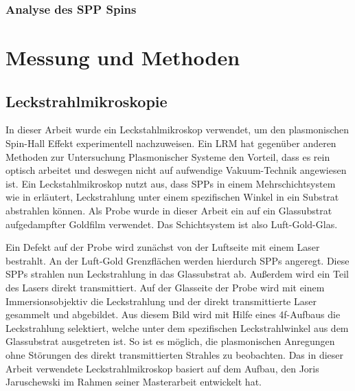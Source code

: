 \documentclass{article}
\begin{document}
	\subsubsection{Analyse des SPP Spins}	
\section{Messung und Methoden}
\subsection{Leckstrahlmikroskopie}
	In dieser Arbeit wurde ein Leckstahlmikroskop verwendet, um den plasmonischen Spin-Hall Effekt experimentell nachzuweisen. Ein LRM hat gegenüber anderen Methoden zur Untersuchung Plasmonischer Systeme den Vorteil, dass es rein optisch arbeitet und deswegen nicht auf aufwendige Vakuum-Technik angewiesen ist. Ein Leckstahlmikroskop nutzt aus, dass SPPs in einem Mehrschichtsystem wie in  erläutert, Leckstrahlung unter einem spezifischen Winkel in ein Substrat abstrahlen können. Als Probe wurde in dieser Arbeit ein auf ein Glassubstrat aufgedampfter Goldfilm verwendet. Das Schichtsystem ist also Luft-Gold-Glas.
	
	Ein Defekt auf der Probe wird zunächst von der Luftseite mit einem Laser bestrahlt. An der Luft-Gold Grenzflächen werden hierdurch SPPs angeregt. Diese SPPs strahlen nun Leckstrahlung in das Glassubstrat ab.
	Außerdem wird ein Teil des Lasers direkt transmittiert. Auf der Glasseite der Probe wird mit einem Immersionsobjektiv die Leckstrahlung und der direkt transmittierte Laser gesammelt und abgebildet.	
	 Aus diesem Bild wird mit Hilfe eines 4f-Aufbaus die Leckstrahlung selektiert, welche unter dem spezifischen Leckstrahlwinkel aus dem Glassubstrat ausgetreten ist. So ist es möglich, die plasmonischen Anregungen ohne Störungen des direkt transmittierten Strahles zu beobachten. Das in dieser Arbeit verwendete Leckstrahlmikroskop basiert auf dem Aufbau, den Joris Jaruschewski im Rahmen seiner Masterarbeit \cite{Jaruschewski.2020} entwickelt hat.
\end{document}
